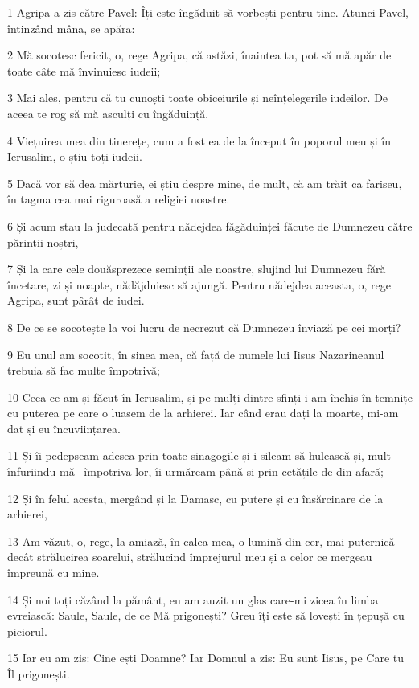 \par 1 Agripa a zis către Pavel: Îți este îngăduit să vorbești pentru tine. Atunci Pavel, întinzând mâna, se apăra:
\par 2 Mă socotesc fericit, o, rege Agripa, că astăzi, înaintea ta, pot să mă apăr de toate câte mă învinuiesc iudeii;
\par 3 Mai ales, pentru că tu cunoști toate obiceiurile și neînțelegerile iudeilor. De aceea te rog să mă asculți cu îngăduință.
\par 4 Viețuirea mea din tinerețe, cum a fost ea de la început în poporul meu și în Ierusalim, o știu toți iudeii.
\par 5 Dacă vor să dea mărturie, ei știu despre mine, de mult, că am trăit ca fariseu, în tagma cea mai riguroasă a religiei noastre.
\par 6 Și acum stau la judecată pentru nădejdea făgăduinței făcute de Dumnezeu către părinții noștri,
\par 7 Și la care cele douăsprezece seminții ale noastre, slujind lui Dumnezeu fără încetare, zi și noapte, nădăjduiesc să ajungă. Pentru nădejdea aceasta, o, rege Agripa, sunt pârât de iudei.
\par 8 De ce se socotește la voi lucru de necrezut că Dumnezeu înviază pe cei morți?
\par 9 Eu unul am socotit, în sinea mea, că față de numele lui Iisus Nazarineanul trebuia să fac multe împotrivă;
\par 10 Ceea ce am și făcut în Ierusalim, și pe mulți dintre sfinți i-am închis în temnițe cu puterea pe care o luasem de la arhierei. Iar când erau dați la moarte, mi-am dat și eu încuviințarea.
\par 11 Și îi pedepseam adesea prin toate sinagogile și-i sileam să hulească și, mult înfuriindu-mă  împotriva lor, îi urmăream până și prin cetățile de din afară;
\par 12 Și în felul acesta, mergând și la Damasc, cu putere și cu însărcinare de la arhierei,
\par 13 Am văzut, o, rege, la amiază, în calea mea, o lumină din cer, mai puternică decât strălucirea soarelui, strălucind împrejurul meu și a celor ce mergeau împreună cu mine.
\par 14 Și noi toți căzând la pământ, eu am auzit un glas care-mi zicea în limba evreiască: Saule, Saule, de ce Mă prigonești? Greu îți este să lovești în țepușă cu piciorul.
\par 15 Iar eu am zis: Cine ești Doamne? Iar Domnul a zis: Eu sunt Iisus, pe Care tu Îl prigonești.
